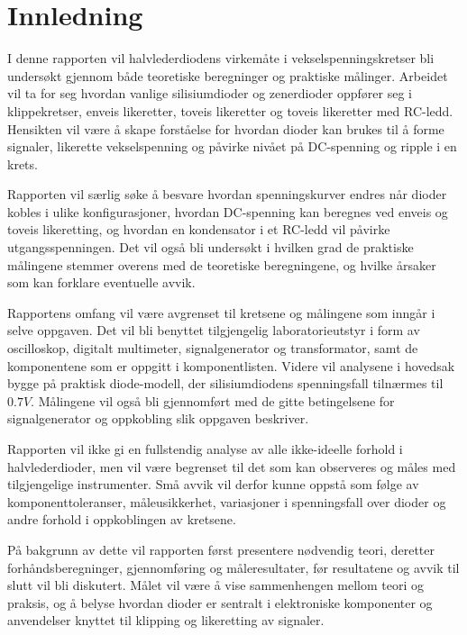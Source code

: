 \section{Innledning}
I denne rapporten vil halvlederdiodens virkemåte i vekselspenningskretser bli undersøkt gjennom både teoretiske beregninger og praktiske målinger. Arbeidet vil ta for seg hvordan vanlige silisiumdioder og zenerdioder oppfører seg i klippekretser, enveis likeretter, toveis likeretter og toveis likeretter med RC-ledd. Hensikten vil være å skape forståelse for hvordan dioder kan brukes til å forme signaler, likerette vekselspenning og påvirke nivået på DC-spenning og ripple i en krets.

Rapporten vil særlig søke å besvare hvordan spenningskurver endres når dioder kobles i ulike konfigurasjoner, hvordan DC-spenning kan beregnes ved enveis og toveis likeretting, og hvordan en kondensator i et RC-ledd vil påvirke utgangsspenningen. Det vil også bli undersøkt i hvilken grad de praktiske målingene stemmer overens med de teoretiske beregningene, og hvilke årsaker som kan forklare eventuelle avvik.

Rapportens omfang vil være avgrenset til kretsene og målingene som inngår i selve oppgaven. Det vil bli benyttet tilgjengelig laboratorieutstyr i form av oscilloskop, digitalt multimeter, signalgenerator og transformator, samt de komponentene som er oppgitt i komponentlisten. Videre vil analysene i hovedsak bygge på praktisk diode-modell, der silisiumdiodens spenningsfall tilnærmes til $0.7V$. Målingene vil også bli gjennomført med de gitte betingelsene for signalgenerator og oppkobling slik oppgaven beskriver. 

Rapporten vil ikke gi en fullstendig analyse av alle ikke-ideelle forhold i halvlederdioder, men vil være begrenset til det som kan observeres og måles med tilgjengelige instrumenter. Små avvik vil derfor kunne oppstå som følge av komponenttoleranser, måleusikkerhet, variasjoner i spenningsfall over dioder og andre forhold i oppkoblingen av kretsene.

På bakgrunn av dette vil rapporten først presentere nødvendig teori, deretter forhåndsberegninger, gjennomføring og måleresultater, før resultatene og avvik til slutt vil bli diskutert. Målet vil være å vise sammenhengen mellom teori og praksis, og å belyse hvordan dioder er sentralt i elektroniske komponenter og anvendelser knyttet til klipping og likeretting av signaler.
